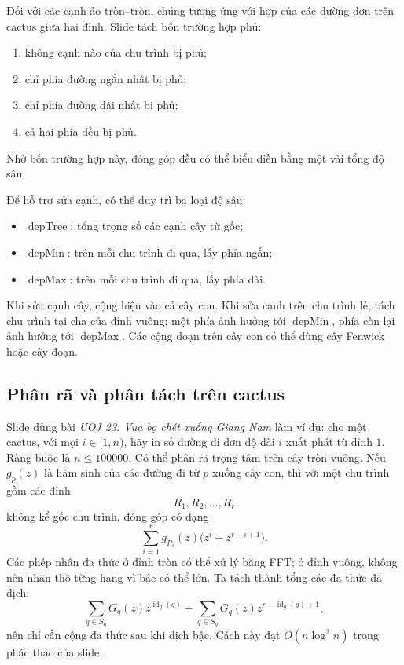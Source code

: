 \documentclass[11pt]{article}
\begin{document}
Đối với các cạnh ảo tròn--tròn, chúng tương ứng với hợp của các đường đơn trên
cactus giữa hai đỉnh. Slide tách bốn trường hợp phủ:
\begin{enumerate}
  \item không cạnh nào của chu trình bị phủ;
  \item chỉ phía đường ngắn nhất bị phủ;
  \item chỉ phía đường dài nhất bị phủ;
  \item cả hai phía đều bị phủ.
\end{enumerate}
Nhờ bốn trường hợp này, đóng góp đều có thể biểu diễn bằng một vài tổng độ sâu.

Để hỗ trợ sửa cạnh, có thể duy trì ba loại độ sâu:
\begin{itemize}
  \item \(\operatorname{depTree}\): tổng trọng số các cạnh cây từ gốc;
  \item \(\operatorname{depMin}\): trên mỗi chu trình đi qua, lấy phía ngắn;
  \item \(\operatorname{depMax}\): trên mỗi chu trình đi qua, lấy phía dài.
\end{itemize}
Khi sửa cạnh cây, cộng hiệu vào cả cây con. Khi sửa cạnh trên chu trình lẻ,
tách chu trình tại cha của đỉnh vuông; một phía ảnh hưởng tới
\(\operatorname{depMin}\), phía còn lại ảnh hưởng tới
\(\operatorname{depMax}\). Các cộng đoạn trên cây con có thể dùng cây Fenwick
hoặc cây đoạn.

\subsection{Phân rã và phân tách trên cactus}

Slide dùng bài \emph{UOJ 23: Vua bọ chét xuống Giang Nam} làm ví dụ: cho một
cactus, với mọi \(i\in[1,n)\), hãy in số đường đi đơn độ dài \(i\) xuất phát
từ đỉnh \(1\). Ràng buộc là \(n\le 100000\). Có thể phân rã trọng tâm trên cây
tròn-vuông. Nếu \(g_p(z)\) là hàm sinh của các đường đi từ \(p\) xuống cây con,
thì với một chu trình gồm các đỉnh
\[
  R_1,R_2,\ldots,R_r
\]
không kể gốc chu trình, đóng góp có dạng
\[
  \sum_{i=1}^r g_{R_i}(z)\bigl(z^i+z^{r-i+1}\bigr).
\]
Các phép nhân đa thức ở đỉnh tròn có thể xử lý bằng FFT; ở đỉnh vuông, không
nên nhân thô từng hạng vì bậc có thể lớn. Ta tách thành tổng các đa thức đã
dịch:
\[
  \sum_{q\in S_g}G_q(z)z^{\operatorname{id}_g(q)}
  +\sum_{q\in S_g}G_q(z)z^{r-\operatorname{id}_g(q)+1},
\]
nên chỉ cần cộng đa thức sau khi dịch bậc. Cách này đạt \(O(n\log^2 n)\) trong
phác thảo của slide.
\end{document}
